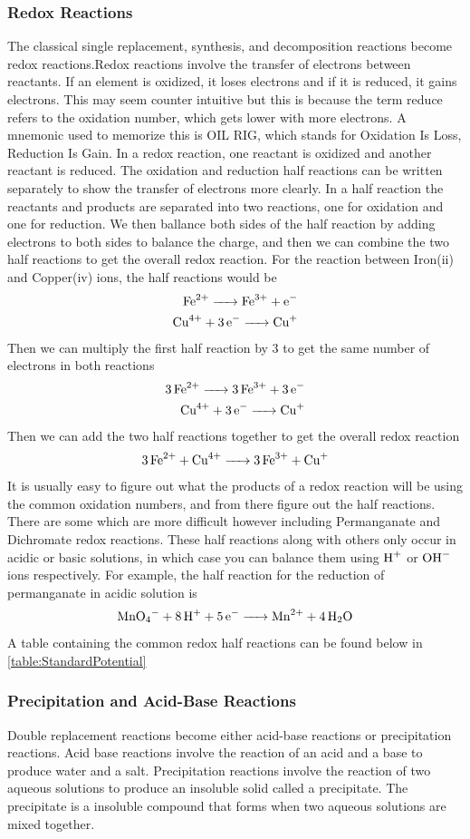 \subsubsection{Redox Reactions}\label{sec:OxidationReduction}
The classical single replacement, synthesis, and decomposition reactions become redox reactions.Redox reactions involve the transfer of electrons between reactants. If an element is oxidized, it loses electrons and if it is reduced, it gains electrons. This may seem counter intuitive but this is because the term reduce refers to the oxidation number, which gets lower with more electrons. A mnemonic used to memorize this is OIL RIG, which stands for Oxidation Is Loss, Reduction Is Gain. In a redox reaction, one reactant is oxidized and another reactant is reduced. The oxidation and reduction half reactions can be written separately to show the transfer of electrons more clearly.
In a half reaction the reactants and products are separated into two reactions, one for oxidation and one for reduction. We then ballance both sides of the half reaction by adding electrons to both sides to balance the charge, and then we can combine the two half reactions to get the overall redox reaction. For the reaction between Iron(ii) and Copper(iv) ions, the half reactions would be
\begin{align*}\ce{Fe^2+ -> Fe^3+ + e-} \\
\ce{Cu^4+ + 3e- -> Cu+}\end{align*}
Then we can multiply the first half reaction by 3 to get the same number of electrons in both reactions
\begin{align*}\ce{3Fe^2+ -> 3Fe^3+ + 3e-} \\
\ce{Cu^4+ + 3e- -> Cu+}\end{align*}
Then we can add the two half reactions together to get the overall redox reaction
\[\ce{3Fe^2+ + Cu^4+ -> 3Fe^3+ + Cu+}\]
It is usually easy to figure out what the products of a redox reaction will be using the common oxidation numbers, and from there figure out the half reactions. There are some which are more difficult however including Permanganate and Dichromate redox reactions. These half reactions along with others only occur in acidic or basic solutions, in which case you can balance them using $\ce{H+}$ or $\ce{OH-}$ ions respectively. For example, the half reaction for the reduction of permanganate in acidic solution is
\[\ce{MnO4- + 8H+ + 5e- -> Mn^2+ + 4H2O}\]
A table containing the common redox half reactions can be found below in \ref{table:StandardPotential}
\subsubsection{Precipitation and Acid-Base Reactions}
Double replacement reactions become either acid-base reactions or precipitation reactions. Acid base reactions involve the reaction of an acid and a base to produce water and a salt. 
Precipitation reactions involve the reaction of two aqueous solutions to produce an insoluble solid called a precipitate. The precipitate is a insoluble compound that forms when two aqueous solutions are mixed together. 
